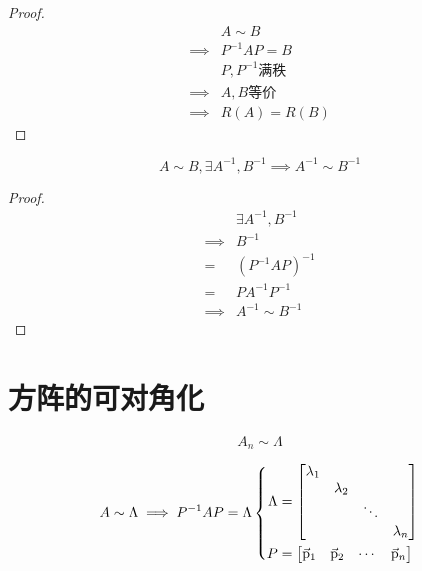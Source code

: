 \documentclass{article}
\begin{document}
\begin{proof}
    \[\begin{aligned}
                     & A\sim B                         \\
            \implies & P^{-1}AP=B                      \\
                     & P,P^{-1}\text{满秩}             \\
            \implies & A,B\text{等价}                  \\
            \implies & R\left(A\right)=R\left(B\right)
        \end{aligned}\]
\end{proof}

\begin{corollary}
    \[A\sim B,\exists A^{-1},B^{-1}\implies A^{-1}\sim B^{-1}\]
\end{corollary}

\begin{proof}
    \[\begin{aligned}
                     & \exists A^{-1},B^{-1}      \\
            \implies & B^{-1}                     \\
            =        & \left(P^{-1}AP\right)^{-1} \\
            =        & PA^{-1}P^{-1}              \\
            \implies & A^{-1}\sim B^{-1}
        \end{aligned}\]
\end{proof}

\section{方阵的可对角化}

\begin{definition}[可对角化]
    \[A_n\sim\Lambda\]
\end{definition}

\begin{corollary}
    \[\def \p {\vec{\rm p}}
        A\sim\Lambda\implies P^{-1}AP=\Lambda
        \left\{\begin{aligned}
            \Lambda & =
            \begin{bmatrix}
                \lambda_1 &           &        &           \\
                          & \lambda_2 &        &           \\
                          &           & \ddots &           \\
                          &           &        & \lambda_n
            \end{bmatrix}                   \\
            P       & =\begin{bmatrix}\p_1&\p_2&\cdots&\p_n\end{bmatrix}
        \end{aligned}\right.\]
\end{corollary}\label{corollary5.0.0.1}
\end{document}

